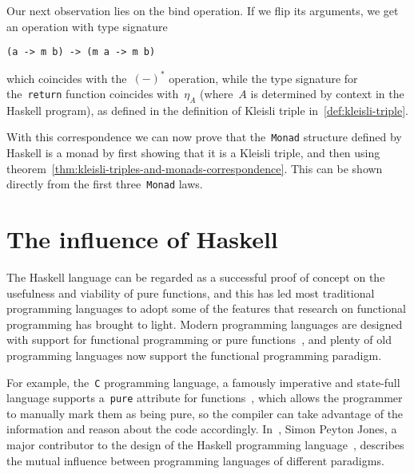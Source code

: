 \documentclass[a4paper]{article}
\theoremstyle{plain}
\theoremstyle{definition}
\begin{document}
Our next observation lies on the bind operation. If we flip its arguments, we
get an operation with type signature
\begin{verbatim}
(a -> m b) -> (m a -> m b)
\end{verbatim}
which coincides with the~\((-)^{\ast}\) operation, while the type signature for
the~\texttt{return} function coincides with~\(\eta_{A}\)
(where~\(A\) is determined by context in the Haskell program), as defined in the
definition of Kleisli triple in~\ref{def:kleisli-triple}.

With this correspondence we can now prove that the~\texttt{Monad}
structure defined by Haskell is a monad by first showing that it is a Kleisli
triple, and then using
theorem~\ref{thm:kleisli-triples-and-monads-correspondence}. This can be shown
directly from the first three~\texttt{Monad} laws.

\section{The influence of Haskell}
The Haskell language can be regarded as a successful proof of concept on the
usefulness and viability of pure functions, and this has led most traditional
programming languages to adopt some of the features that research on functional
programming has brought to light. Modern programming languages are designed with
support for functional programming or pure functions~\cite{enwiki:1023837642},
and plenty of old programming languages now support the functional programming
paradigm.

For example, the~\texttt{C} programming language, a famously imperative
and state-full language supports a~\texttt{pure} attribute for
functions~\cite{gccdoc:attributes}, which allows the programmer to manually mark
them as being pure, so the compiler can take advantage of the information and
reason about the code accordingly.  In~\cite{haskell-useless}, Simon Peyton
Jones, a major contributor to the design of the Haskell programming
language~\cite{Simeone}, describes the mutual influence between programming
languages of different paradigms.

\printbibliography
\end{document}
